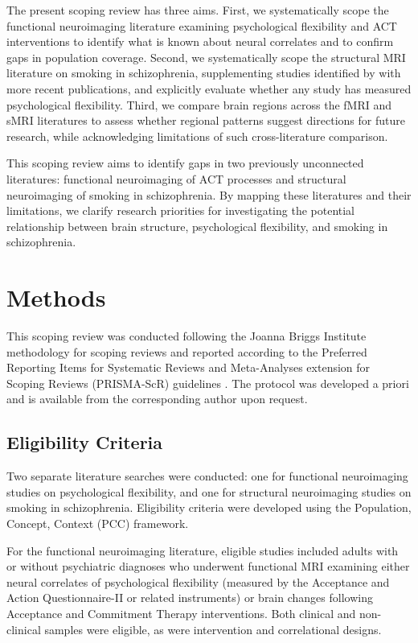 \documentclass[12pt]{article}
\begin{document}
The present scoping review has three aims. First, we systematically scope the functional neuroimaging literature examining psychological flexibility and ACT interventions to identify what is known about neural correlates and to confirm gaps in population coverage. Second, we systematically scope the structural MRI literature on smoking in schizophrenia, supplementing studies identified by \citet{koster2025} with more recent publications, and explicitly evaluate whether any study has measured psychological flexibility. Third, we compare brain regions across the fMRI and sMRI literatures to assess whether regional patterns suggest directions for future research, while acknowledging limitations of such cross-literature comparison.

This scoping review aims to identify gaps in two previously unconnected literatures: functional neuroimaging of ACT processes and structural neuroimaging of smoking in schizophrenia. By mapping these literatures and their limitations, we clarify research priorities for investigating the potential relationship between brain structure, psychological flexibility, and smoking in schizophrenia.

\section{Methods}

This scoping review was conducted following the Joanna Briggs Institute methodology for scoping reviews \citep{peters2020} and reported according to the Preferred Reporting Items for Systematic Reviews and Meta-Analyses extension for Scoping Reviews (PRISMA-ScR) guidelines \citep{tricco2018}. The protocol was developed a priori and is available from the corresponding author upon request.

\subsection{Eligibility Criteria}

Two separate literature searches were conducted: one for functional neuroimaging studies on psychological flexibility, and one for structural neuroimaging studies on smoking in schizophrenia. Eligibility criteria were developed using the Population, Concept, Context (PCC) framework.

For the functional neuroimaging literature, eligible studies included adults with or without psychiatric diagnoses who underwent functional MRI examining either neural correlates of psychological flexibility (measured by the Acceptance and Action Questionnaire-II or related instruments) or brain changes following Acceptance and Commitment Therapy interventions. Both clinical and non-clinical samples were eligible, as were intervention and correlational designs.
\end{document}
